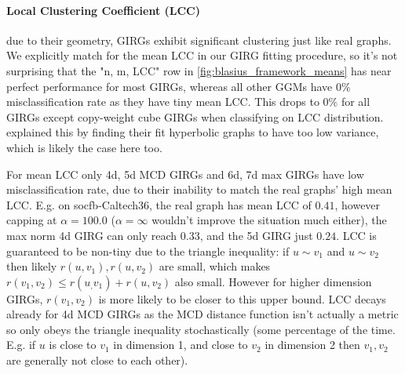 


\paragraph{Local Clustering Coefficient (LCC)} due to their geometry, GIRGs exhibit significant clustering just like real graphs. We explicitly match for the mean LCC in our GIRG fitting procedure, so it's not surprising that the "n, m, LCC" row in \cref{fig:blasius_framework_means} has near perfect performance for most GIRGs, whereas all other GGMs have $0\%$ misclassification rate as they have tiny mean LCC. This drops to $0\%$ for all GIRGs except copy-weight cube GIRGs when classifying on LCC distribution.  \cite{blasius2018towards} explained this by finding their fit hyperbolic graphs to have too low variance, which is likely the case here too.

For mean LCC only 4d, 5d MCD GIRGs and 6d, 7d max GIRGs have low misclassification rate, due to their inability to match the real graphs' high mean LCC. E.g. on socfb-Caltech36, the real graph has mean LCC of $0.41$, however capping at $\alpha=100.0$ ($\alpha=\infty$ wouldn't improve the situation much either), the max norm 4d GIRG can only reach $0.33$, and the 5d GIRG just $0.24$. LCC is guaranteed to be non-tiny due to the triangle inequality: if $u \sim v_1$ and $u \sim v_2$ then likely $r(u, v_1), r(u, v_2)$ are small, which makes $r(v_1, v_2) \leq r(u_, v_1) + r(u, v_2)$ also small. However for higher dimension GIRGs, $r(v_1, v_2)$ is more likely to be closer to this upper bound. LCC decays already for 4d MCD GIRGs as the MCD distance function isn't actually a metric so only obeys the triangle inequality stochastically (some percentage of the time. E.g. if $u$ is close to $v_1$ in dimension 1, and close to $v_2$ in dimension 2 then $v_1, v_2$ are generally not close to each other).



